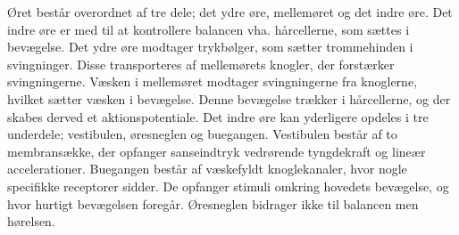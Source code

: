 Øret består overordnet af tre dele; det ydre øre, mellemøret og det indre øre. Det indre øre er med til at kontrollere balancen vha. hårcellerne, som sættes i bevægelse. Det ydre øre modtager trykbølger, som sætter trommehinden i svingninger. Disse transporteres af mellemørets knogler, der forstærker svingningerne. Væsken i mellemøret modtager svingningerne fra knoglerne, hvilket sætter væsken i bevægelse. Denne bevægelse trækker i hårcellerne, og der skabes derved et aktionspotentiale. %
Det indre øre kan yderligere opdeles i tre underdele; vestibulen, øresneglen og buegangen. Vestibulen består af to membransække, der opfanger sanseindtryk vedrørende tyngdekraft og lineær accelerationer. Buegangen består af væskefyldt knoglekanaler, hvor nogle specifikke receptorer sidder. De opfanger stimuli omkring hovedets bevægelse, og hvor hurtigt bevægelsen foregår. %
Øresneglen bidrager ikke til balancen men hørelsen.


